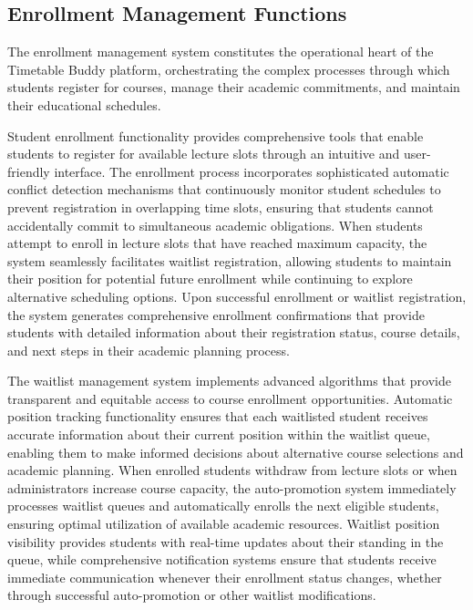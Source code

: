 \subsection{Enrollment Management Functions}

The enrollment management system constitutes the operational heart of the Timetable Buddy platform, orchestrating the complex processes through which students register for courses, manage their academic commitments, and maintain their educational schedules.

Student enrollment functionality provides comprehensive tools that enable students to register for available lecture slots through an intuitive and user-friendly interface. The enrollment process incorporates sophisticated automatic conflict detection mechanisms that continuously monitor student schedules to prevent registration in overlapping time slots, ensuring that students cannot accidentally commit to simultaneous academic obligations. When students attempt to enroll in lecture slots that have reached maximum capacity, the system seamlessly facilitates waitlist registration, allowing students to maintain their position for potential future enrollment while continuing to explore alternative scheduling options. Upon successful enrollment or waitlist registration, the system generates comprehensive enrollment confirmations that provide students with detailed information about their registration status, course details, and next steps in their academic planning process.

The waitlist management system implements advanced algorithms that provide transparent and equitable access to course enrollment opportunities. Automatic position tracking functionality ensures that each waitlisted student receives accurate information about their current position within the waitlist queue, enabling them to make informed decisions about alternative course selections and academic planning. When enrolled students withdraw from lecture slots or when administrators increase course capacity, the auto-promotion system immediately processes waitlist queues and automatically enrolls the next eligible students, ensuring optimal utilization of available academic resources. Waitlist position visibility provides students with real-time updates about their standing in the queue, while comprehensive notification systems ensure that students receive immediate communication whenever their enrollment status changes, whether through successful auto-promotion or other waitlist modifications.

